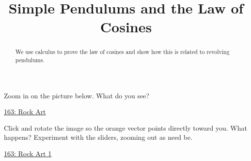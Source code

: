 \documentclass{ximera}
\title{Simple Pendulums and the Law of Cosines}
\begin{document}
\begin{abstract}
We use calculus to prove the law of cosines and show how this is related to revolving pendulums.
\end{abstract}
\maketitle







\begin{exploration}
Zoom in on the picture below. What do you see?
\begin{onlineOnly}
    \begin{center}
\end{center}
\end{onlineOnly}

\href{https://www.desmos.com/calculator/awoec8d6pq}{163: Rock Art}
\end{exploration}


\begin{exploration}
Click and rotate the image so the orange vector points directly toward you. What happens? Experiment with the sliders, zooming out as need be.
\begin{onlineOnly}
    \begin{center}
\end{center}
\end{onlineOnly}

\href{https://www.desmos.com/3d/9g2timus2m}{163: Rock Art 1}
\end{exploration}
\end{document}
